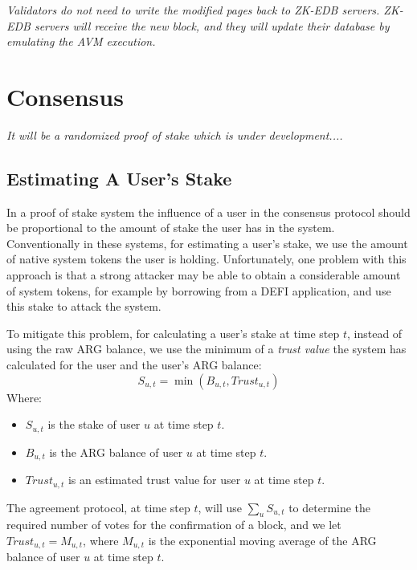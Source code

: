 \documentclass[11pt, a4paper]{report}
\newcommand{\note}[1] {
    \begin{tcolorbox}[colframe=white,colback=white]
        \emph{#1}
    \end{tcolorbox}
}
\begin{document}
    \note{Validators do not need to write the modified pages back to ZK-EDB servers. ZK-EDB servers will receive the new
    block, and they will update their database by emulating the AVM execution.}


    \section{Consensus}\label{sec:consensus}

    \note{It will be a randomized proof of stake which is under development....}

    \subsection{Estimating A User's Stake}\label{subsec:estimating-a-user's-stake}

    In a proof of stake system the influence of a user in the consensus protocol should be proportional to the amount
    of stake the user has in the system. Conventionally in these systems, for estimating a user's stake, we use the
    amount of native system tokens the user is holding. Unfortunately, one problem with this approach is that a
    strong attacker may be able to obtain a considerable amount of system tokens, for example by borrowing from a
    DEFI application, and use this stake to attack the system.

    To mitigate this problem, for calculating a user's stake at time step \(t\), instead of using the raw ARG
    balance, we use the minimum of a \emph{trust value} the system has calculated for the user and the user's
    ARG balance:
    \[
        S_{u,t} = \min (B_{u,t}, Trust_{u,t})
    \]
    Where:
    \begin{itemize}
        \item \(S_{u,t}\) is the stake of user \(u\) at time step \(t\).
        \item \(B_{u,t}\) is the ARG balance of user \(u\) at time step \(t\).
        \item \(Trust_{u,t}\) is an estimated trust value for user \(u\) at time step \(t\).
    \end{itemize}

    The agreement protocol, at time step \(t\), will use \(\sum_{u}S_{u,t}\) to determine the required
    number of votes for the confirmation of a block, and we let \(Trust_{u,t} = M_{u,t}\), where \(M_{u,t}\) is the
    exponential moving average of the ARG balance of user \(u\) at time step \(t\).
\end{document}
